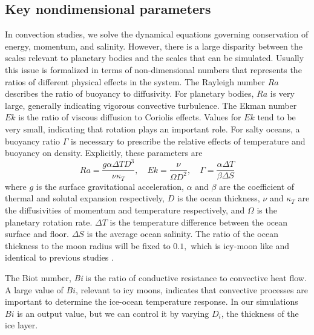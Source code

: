 \documentclass[12pt]{article}
\begin{document}
\subsection{Key nondimensional parameters}
In convection studies, we solve the dynamical equations governing conservation of energy, momentum, and salinity. However, there is a large disparity between the scales relevant to planetary bodies and the scales that can be simulated. 
Usually this issue is formalized in terms of non-dimensional numbers that represents the ratios of different physical effects in the system. %
The Rayleigh number $Ra$ describes the ratio of buoyancy to diffusivity. For planetary bodies, $Ra$ is very large, generally indicating vigorous convective turbulence.
The Ekman number $Ek$ is the ratio of viscous diffusion to Coriolis effects. Values for $Ek$ tend to be very small, indicating that rotation plays an important role.
For salty oceans, a buoyancy ratio $\Gamma$ is necessary to prescribe the relative effects of temperature and buoyancy on density.
Explicitly, these parameters are
\[Ra = \frac{g\alpha\Delta T D^{3}}{\nu\kappa_{T}},\quad Ek = \frac{\nu}{\Omega D^{2}},\quad \Gamma = \frac{\alpha\Delta T}{\beta \Delta S}\]%
where $g$ is the surface gravitational acceleration, $\alpha$ and $\beta$ are the coefficient of thermal and solutal expansion respectively, $D$ is the ocean thickness, $\nu$ and $\kappa_T$ are the diffusivities of momentum and temperature respectively, and $\Omega$ is the planetary rotation rate.
$\Delta T$ is the temperature difference between the ocean surface and floor. $\Delta S$ is the average ocean salinity. 
The ratio of the ocean thickness to the moon radius will be fixed to $0.1,$ which is icy-moon like and identical to previous studies \citep{dL23,kS19}.

The Biot number, \textit{Bi}\citep{jL24} is the ratio of conductive resistance to convective heat flow. A large value of $Bi$, relevant to icy moons, indicates that convective processes are important to determine the ice-ocean temperature response.
In our simulations $Bi$ is an output value, but we can control it by varying $D_{i}$, the thickness of the ice layer. 
\end{document}
